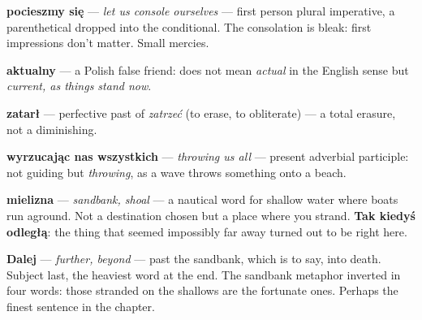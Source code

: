 
\textbf{pocieszmy się} --- \textit{let us console ourselves} --- first person 
plural imperative, a parenthetical dropped into the conditional. The consolation 
is bleak: first impressions don't matter. Small mercies.

\textbf{aktualny} --- a Polish false friend: does not mean \textit{actual} 
in the English sense but \textit{current, as things stand now}.



\textbf{zatarł} --- perfective past of \textit{zatrzeć} (to erase, to obliterate) 
--- a total erasure, not a diminishing.

\textbf{wyrzucając nas wszystkich} --- \textit{throwing us all} --- present 
adverbial participle: not guiding but \textit{throwing}, as a wave throws 
something onto a beach.

\textbf{mielizna} --- \textit{sandbank, shoal} --- a nautical word for shallow 
water where boats run aground. Not a destination chosen but a place where you 
strand. \textbf{Tak kiedyś odległą}: the thing that seemed impossibly far 
away turned out to be right here.



\textbf{Dalej} --- \textit{further, beyond} --- past the sandbank, which is 
to say, into death. Subject last, the heaviest word at the end. The sandbank 
metaphor inverted in four words: those stranded on the shallows are the 
fortunate ones. Perhaps the finest sentence in the chapter.



